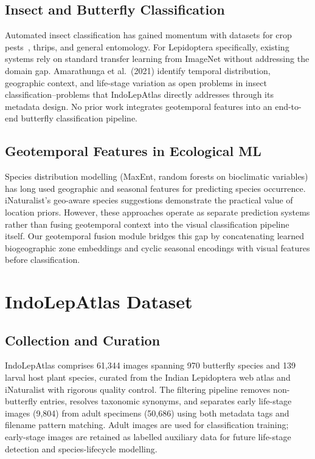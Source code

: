 \documentclass[11pt]{article}
\begin{document}
\subsection{Insect and Butterfly Classification}
Automated insect classification has gained momentum with datasets for crop pests~\cite{amarathunga2022thrips}, thrips, and general entomology. For Lepidoptera specifically, existing systems rely on standard transfer learning from ImageNet without addressing the domain gap. Amarathunga et al.~(2021) identify temporal distribution, geographic context, and life-stage variation as open problems in insect classification--problems that IndoLepAtlas directly addresses through its metadata design. No prior work integrates geotemporal features into an end-to-end butterfly classification pipeline.

\subsection{Geotemporal Features in Ecological ML}
Species distribution modelling (MaxEnt, random forests on bioclimatic variables) has long used geographic and seasonal features for predicting species occurrence. iNaturalist's geo-aware species suggestions demonstrate the practical value of location priors. However, these approaches operate as separate prediction systems rather than fusing geotemporal context into the visual classification pipeline itself. Our geotemporal fusion module bridges this gap by concatenating learned biogeographic zone embeddings and cyclic seasonal encodings with visual features before classification.

\section{IndoLepAtlas Dataset}

\subsection{Collection and Curation}
IndoLepAtlas comprises 61,344 images spanning 970 butterfly species and 139 larval host plant species, curated from the Indian Lepidoptera web atlas and iNaturalist with rigorous quality control. The filtering pipeline removes non-butterfly entries, resolves taxonomic synonyms, and separates early life-stage images (9,804) from adult specimens (50,686) using both metadata tags and filename pattern matching. Adult images are used for classification training; early-stage images are retained as labelled auxiliary data for future life-stage detection and species-lifecycle modelling.
\end{document}
